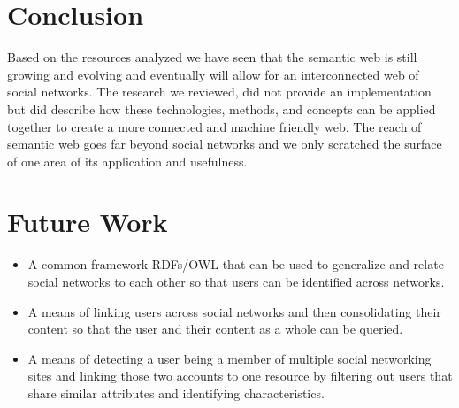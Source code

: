 \documentclass[10pt,journal,compsoc]{IEEEtran}
\begin{document}
\section{Conclusion}
Based on the resources analyzed we have seen that the semantic web is still growing and evolving and eventually will allow for an interconnected web of social networks. The research we reviewed, did not provide an implementation but did describe how these technologies, methods, and concepts can be applied together to create a more connected and machine friendly web. The reach of semantic web goes far beyond social networks and we only scratched the surface of one area of its application and usefulness.


\section{Future Work}
\begin{itemize}
\item
A common framework RDFs/OWL that can be used to generalize and relate social networks to each other so that users can be identified across networks.
\item
A means of linking users across social networks and then consolidating their content so that the user and their content as a whole can be queried.
\item
A means of detecting a user being a member of multiple social networking sites and linking those two accounts to one resource by filtering out users that share similar attributes and identifying characteristics.
\end{itemize}

%




 
\nocite{*}

\end{document}
